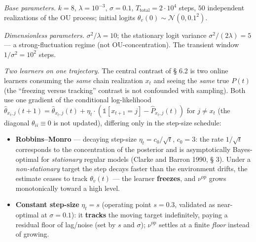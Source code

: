 \documentclass[pdflatex,sn-mathphys-ay]{sn-jnl}
\providecommand{\tightlist}{\setlength{\itemsep}{0pt}\setlength{\parskip}{0pt}}
\begin{document}
\emph{Base parameters.} \(k = 8\), \(\lambda = 10^{-3}\), \(\sigma = 0.1\), \(T_{\text{total}} = 2 \cdot 10^4\) steps, \(50\) independent realizations of the OU process; initial logits \(\theta_v(0) \sim \mathcal{N}(0, 0.1^2)\).



\emph{Dimensionless parameters.} \(\sigma^2/\lambda = 10\); the stationary logit variance \(\sigma^2/(2\lambda) = 5\) --- a strong-fluctuation regime (not OU-concentration). The transient window \(1/\sigma^2 = 10^2\) steps.



\emph{Two learners on one trajectory.} The central contrast of § 6.2 is two online learners consuming the \emph{same} chain realization \(x_t\) and seeing the \emph{same} true \(P(t)\) (the ``freezing versus tracking'' contrast is not confounded with sampling). Both use one gradient of the conditional log-likelihood \(\hat\theta_{x_t, j}(t+1) = \hat\theta_{x_t, j}(t) + \eta_t \cdot (\mathbb{1}[x_{t+1} = j] - \hat P_{x_t, j}(t))\) for \(j \ne x_t\) (the diagonal \(\theta_{ii} \equiv 0\) is not updated), differing only in the step-size schedule:



\begin{itemize}

\tightlist

\item

  \textbf{Robbins--Monro} --- decaying step-size \(\eta_t = c_0 / \sqrt{t}\), \(c_0 = 3\): the rate \(1/\sqrt{t}\) corresponds to the concentration of the posterior and is asymptotically Bayes-optimal for \emph{stationary} regular models (Clarke and Barron 1990, § 3). Under a \emph{non-stationary} target the step decays faster than the environment drifts, the estimate ceases to track \(\theta_v(t)\) --- the learner \textbf{freezes}, and \(\nu^{\text{op}}\) grows monotonically toward a high level.

\item

  \textbf{Constant step-size} \(\eta_t = s\) (operating point \(s = 0.3\), validated as near-optimal at \(\sigma = 0.1\)): it \textbf{tracks} the moving target indefinitely, paying a residual floor of lag/noise (set by \(s\) and \(\sigma\)); \(\nu^{\text{op}}\) settles at a finite \emph{floor} instead of growing.

\end{itemize}
\end{document}

